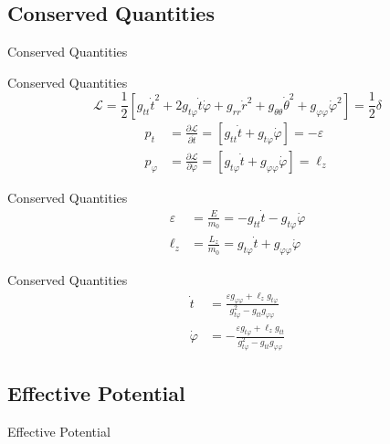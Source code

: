 \documentclass{beamer}
\begin{document}
\subsection{Conserved Quantities}
\begin{frame}
	\huge
    Conserved Quantities
\end{frame}

\begin{frame}{Conserved Quantities}	
	$$ \mathcal{L} =\frac{1}{2}  \left[ g_{tt} \dot{t}^2 + 2g_{t \varphi} \dot{t} \dot{\varphi} + g_{rr} \dot{r}^2 + g_{\theta \theta} \dot{\theta}^2 + g_{\varphi \varphi} \dot{\varphi}^2 \right] = \frac{1}{2} \delta$$
	\pause
	\begin{align*}
	p_t &= \frac{\partial \mathcal{L}}{\partial \dot{t}} =  \left[ g_{tt} \dot{t} + g_{t \varphi} \dot{\varphi} \right] = - \varepsilon  \\
	p_\varphi &= \frac{\partial \mathcal{L}}{\partial \dot{\varphi}} = \left[ g_{t \varphi} \dot{t} + g_{\varphi \varphi} \dot{\varphi} \right] = \ell_z 
	\end{align*}
\end{frame}

\begin{frame}{Conserved Quantities}
	\begin{align*}
	\varepsilon &= \frac{E}{m_0} = - g_{tt} \dot{t} - g_{t \varphi} \dot{\varphi}    \\
	\ell_z &= \frac{L_z}{m_0} =  g_{t \varphi} \dot{t} + g_{\varphi \varphi} \dot{\varphi}  
	\end{align*}
\end{frame}

\begin{frame}{Conserved Quantities}
	\begin{align*}
	\dot{t} &= \frac{\varepsilon g_{\varphi \varphi} + \ell_z g_{t \varphi}}{g_{t \varphi}^2 - g_{tt} g_{\varphi \varphi}} \\
	\dot{\varphi} &= - \frac{\varepsilon g_{t \varphi} + \ell_z g_{tt}}{g_{t \varphi}^2 - g_{tt} g_{\varphi \varphi}}  
	\end{align*}	
\end{frame}

\subsection{Effective Potential}
\begin{frame}
	\huge
    Effective Potential
\end{frame}
\end{document}
